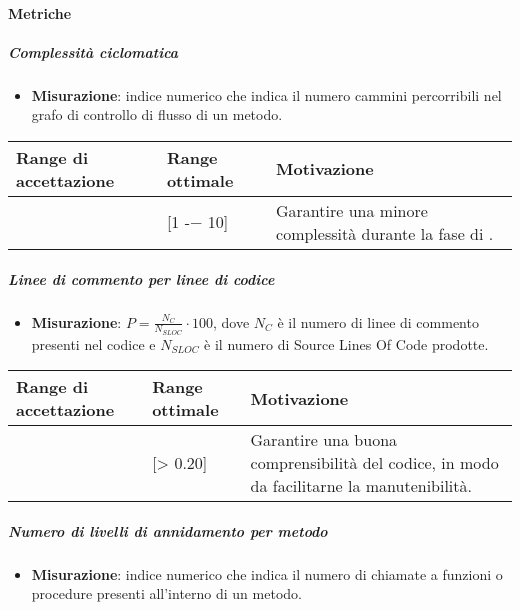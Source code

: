 \paragraph{Metriche}

\subparagraph{Complessità ciclomatica}

\begin{itemize}
\item \textbf{Misurazione}: indice numerico che indica il numero cammini percorribili nel grafo di controllo di flusso di un metodo.
\end{itemize}

\begin{center}
		\begin{tabular}{|P{2.5cm}|P{2.5cm}|P{6cm}|}
		\hline
			\textbf{Range di accettazione}	& \textbf{Range ottimale} & \textbf{Motivazione} \\
			\hline
			[1 -− 15] & [1 -− 10] &	Garantire una minore complessità durante la fase di \COD. \\
			\hline
			\end{tabular}
\end{center}


\subparagraph{Linee di commento per linee di codice}

\begin{itemize}
\item \textbf{Misurazione}: $P=\frac{N_{C}}{N_{SLOC}} \cdot 100$, dove $N_{C}$ è il numero di linee di commento presenti nel codice e $N_{SLOC}$ è il numero di Source Lines Of Code prodotte.
\end{itemize}

\begin{center}
		\begin{tabular}{|P{2.5cm}|P{2.5cm}|P{6cm}|}
		\hline
			\textbf{Range di accettazione}	& \textbf{Range ottimale} & \textbf{Motivazione} \\
			\hline
			[> 0.15] & [> 0.20] &	Garantire una buona comprensibilità del codice, in modo da facilitarne la manutenibilità. \\
			\hline
			\end{tabular}
\end{center}

\subparagraph{Numero di livelli di annidamento per metodo}

\begin{itemize}
\item \textbf{Misurazione}: indice numerico che indica il numero di chiamate a funzioni o procedure presenti all'interno di un metodo.
\end{itemize}

